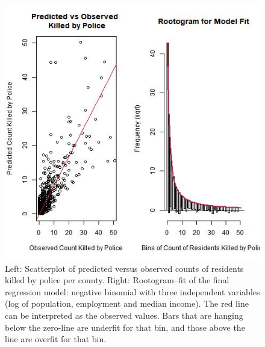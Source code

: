 \documentclass[sigconf]{acmart}
\begin{document}
\begin{figure}
\includegraphics[width=1.0\textwidth]{images/figure2.jpg}
\caption{Left: Scatterplot of predicted versus observed counts of residents killed by police per county. Right: Rootogram--fit of the final regression model: negative binomial with three independent variables (log of population, employment and median income).  The red line can be interpreted as the observed values.  Bars that are hanging below the zero-line are underfit for that bin, and those above the line are overfit for that bin.}
\end{figure}
\end{document}
